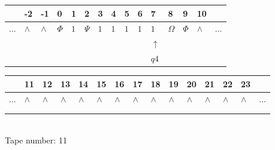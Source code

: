 \documentclass[11pt]{article}
\begin{document}
\begin{table}[H]
\centering
\begin{tabular}{lllllllllllllll}
 & -2 & -1 & 0 & 1 & 2 & 3 & 4 & 5 & 6 & 7 & 8 & 9 & 10 & \\
\hline
$...$ & \multicolumn{1}{|l|}{$\wedge$} & \multicolumn{1}{|l|}{$\wedge$} & \multicolumn{1}{|l|}{$\Phi$} & \multicolumn{1}{|l|}{$1$} & \multicolumn{1}{|l|}{$\Psi$} & \multicolumn{1}{|l|}{$1$} & \multicolumn{1}{|l|}{$1$} & \multicolumn{1}{|l|}{$1$} & \multicolumn{1}{|l|}{$1$} & \multicolumn{1}{|l|}{$1$} & \multicolumn{1}{|l|}{$\Omega$} & \multicolumn{1}{|l|}{$\Phi$} & \multicolumn{1}{|l|}{$\wedge$} & $...$\\
\hline
&  &  &  &  &  &  &  &  &  & $\uparrow$ &  &  &  &  \\
&  &  &  &  &  &  &  &  &  & $ q4 $ &  &  &  &  \\
\end{tabular}
\begin{tabular}{lllllllllllllll}
 & 11 & 12 & 13 & 14 & 15 & 16 & 17 & 18 & 19 & 20 & 21 & 22 & 23 & \\
\hline
$...$ & \multicolumn{1}{|l|}{$\wedge$} & \multicolumn{1}{|l|}{$\wedge$} & \multicolumn{1}{|l|}{$\wedge$} & \multicolumn{1}{|l|}{$\wedge$} & \multicolumn{1}{|l|}{$\wedge$} & \multicolumn{1}{|l|}{$\wedge$} & \multicolumn{1}{|l|}{$\wedge$} & \multicolumn{1}{|l|}{$\wedge$} & \multicolumn{1}{|l|}{$\wedge$} & \multicolumn{1}{|l|}{$\wedge$} & \multicolumn{1}{|l|}{$\wedge$} & \multicolumn{1}{|l|}{$\wedge$} & \multicolumn{1}{|l|}{$\wedge$} & $...$\\
\hline
&  &  &  &  &  &  &  &  &  &  &  &  &  &  \\
&  &  &  &  &  &  &  &  &  &  &  &  &  &  \\
\end{tabular}
\\
Tape number: 11
\noindent\makebox[\linewidth]{\hdashrule{\textwidth}{1pt}{1pt}}\end{table}
\clearpage
\end{document}
